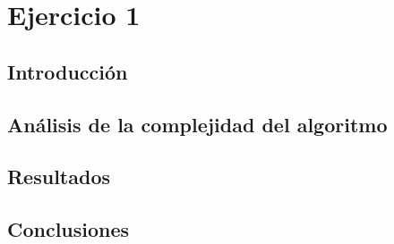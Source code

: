 \section{Ejercicio 1}

\subsection{Introducción}


\subsection{Análisis de la complejidad del algoritmo}

\subsection{Resultados}
\label{Resultados1}

\subsection{Conclusiones}
